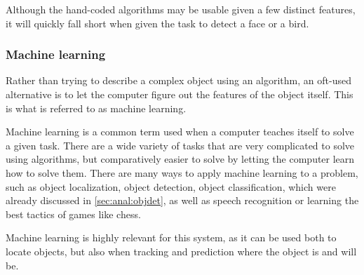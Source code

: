 Although the hand-coded algorithms may be usable given a few distinct features, it will quickly fall short when given the task to detect a face or a bird.

\subsubsection{Machine learning}\label{sec:obj_tracking:sub:ML}
Rather than trying to describe a complex object using an algorithm, an oft-used alternative is to let the computer figure out the features of the object itself.
This is what is referred to as machine learning.

Machine learning is a common term used when a computer teaches itself to solve a given task\cite{ArtificialIntelligencealanpoole}.
There are a wide variety of tasks that are very complicated to solve using algorithms, but comparatively easier to solve by letting the computer learn how to solve them. 
There are many ways to apply machine learning to a problem, such as object localization, object detection, object classification, which were already discussed in \autoref{sec:anal:objdet}, as well as speech recognition or learning the best tactics of games like chess.

Machine learning is highly relevant for this system, as it can be used both to locate objects, but also when tracking and prediction where the object is and will be.